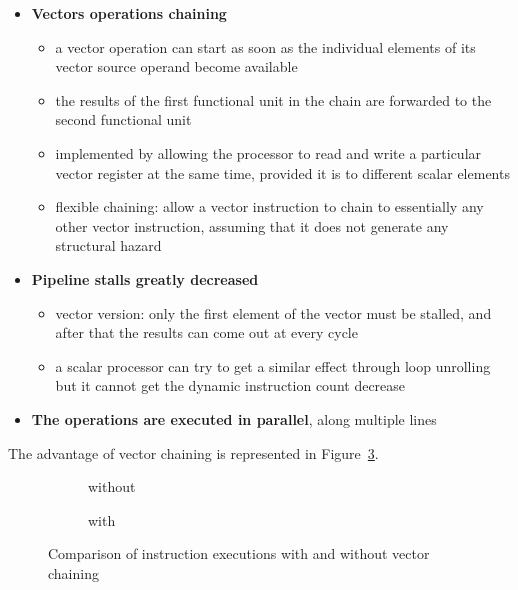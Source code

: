 \documentclass[english]{article}
\begin{document}
\begin{itemize}
  \item \textbf{Vectors operations chaining}
        \begin{itemize}
          \item a vector operation can start as soon as the individual elements of its vector source operand become available
          \item the results of the first functional unit in the chain are forwarded to the second functional unit
          \item implemented by allowing the processor to read and write a particular vector register at the same time, provided it is to different scalar elements
          \item flexible chaining: allow a vector instruction to chain to essentially any other vector instruction, assuming that it does not generate any structural hazard
        \end{itemize}
  \item \textbf{Pipeline stalls greatly decreased}
        \begin{itemize}
          \item vector version: only the first element of the vector must be stalled, and after that the results can come out at every cycle
          \item a scalar processor can try to get a similar effect through loop unrolling but it cannot get the dynamic instruction count decrease
        \end{itemize}
  \item \textbf{The operations are executed in parallel}, along multiple lines
\end{itemize}

\bigskip
The advantage of vector chaining is represented in Figure~\ref{fig:vector-chaining}.

\begin{figure}[htbp]
  \bigskip
  \centering
  \begin{subfigure}[b]{0.495\textwidth}
    \centering
    \caption{without}
    \label{subfig:wihtout-vector-chaining}
  \end{subfigure}
  \begin{subfigure}[b]{0.495\textwidth}
    \centering
    \caption{with}
    \label{subfig:with-vector-chaining}
  \end{subfigure}
  \caption{Comparison of instruction executions with and without vector chaining}
  \label{fig:vector-chaining}
  \bigskip
\end{figure}
\end{document}
